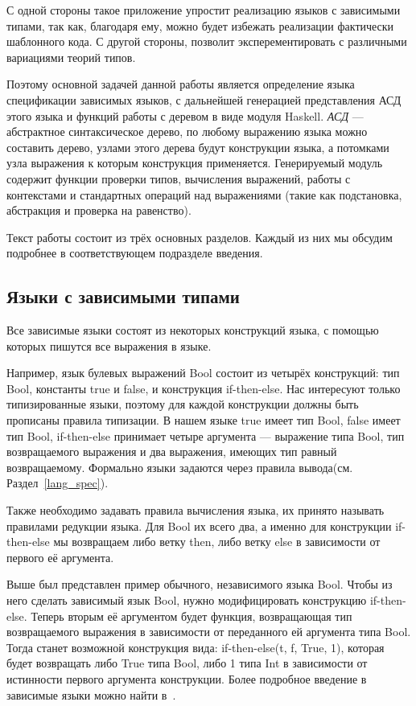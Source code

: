 С одной стороны такое приложение упростит реализацию языков с зависимыми типами, так как, благодаря ему, можно будет избежать реализации фактически шаблонного кода. С другой стороны, позволит эксперементировать с различными вариациями теорий типов.

Поэтому основной задачей данной работы является определение языка спецификации зависимых языков, с дальнейшей генерацией представления АСД этого языка и функций работы с деревом в виде модуля Haskell\cite{haskell}. \textit{АСД} --- абстрактное синтаксическое дерево, по любому выражению языка можно составить дерево, узлами этого дерева будут конструкции языка, а потомками узла выражения к которым конструкция применяется. Генерируемый модуль содержит функции проверки типов, вычисления выражений, работы с контекстами и стандартных операций над выражениями (такие как подстановка, абстракция и проверка на равенство).

Текст работы состоит из трёх основных разделов. Каждый из них мы обсудим подробнее в соответствующем подразделе введения.

\subsection*{Языки с зависимыми типами}

Все зависимые языки состоят из некоторых конструкций языка, с помощью которых пишутся все выражения в языке.

Например, язык булевых выражений Bool состоит из четырёх конструкций: тип Bool, константы true и false, и конструкция if-then-else. Нас интересуют только типизированные языки, поэтому для каждой конструкции должны быть прописаны правила типизации. В нашем языке true имеет тип Bool, false имеет тип Bool, if-then-else принимает четыре аргумента --- выражение типа Bool, тип возвращаемого выражения и два выражения, имеющих тип равный возвращаемому. Формально языки задаются через правила вывода(см. Раздел~\ref{lang_spec}).

Также необходимо задавать правила вычисления языка, их принято называть правилами редукции языка. Для Bool их всего два, а именно для конструкции if-then-else мы возвращаем либо ветку then, либо ветку else в зависимости от первого её аргумента.

Выше был представлен пример обычного, независимого языка Bool. Чтобы из него сделать зависимый язык Bool, нужно модифицировать конструкцию if-then-else. Теперь вторым её аргументом будет функция, возвращающая тип возвращаемого выражения в зависимости от переданного ей аргумента типа Bool. Тогда станет возможной конструкция вида: if-then-else(t, f, True, 1), которая будет возвращать либо True типа Bool, либо 1 типа Int в зависимости от истинности первого аргумента конструкции. Более подробное введение в зависимые языки можно найти в~\cite{martin_lof}.

